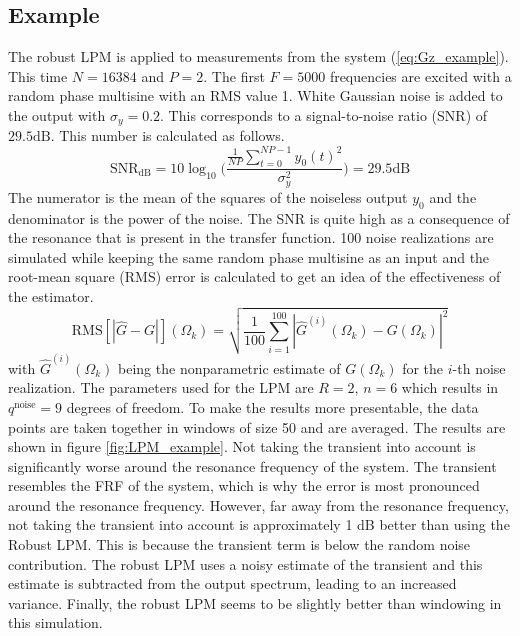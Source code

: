 \newpage
\subsection{Example}
The robust LPM is applied to measurements from the system (\ref{eq:Gz_example}). This time $N = 16384$ and $P=2$. The first $F=5000$ frequencies are excited with a random phase multisine with an RMS value 1. White Gaussian noise is added to the output with $\sigma_y = 0.2$. This corresponds to a signal-to-noise ratio (SNR) of $29.5 \mathrm{dB}$. This number is calculated as follows.
\begin{equation*}
    \mathrm{SNR}_{\mathrm{dB}} = 10 \log_{10} \Big ( \frac{\frac{1}{NP}\sum_{t=0}^{NP-1}y_0(t)^2}{\sigma_y^2} \Big ) = 29.5 \mathrm{dB}
\end{equation*}
The numerator is the mean of the squares of the noiseless output $y_0$ and the denominator is the power of the noise. The SNR is quite high as a consequence of the resonance that is present in the transfer function. 100 noise realizations are simulated while keeping the same random phase multisine as an input and the root-mean square (RMS) error is calculated to get an idea of the effectiveness of the estimator.
\begin{equation*}
    \text{RMS}[|\hat G - G|](\Omega_k) = \sqrt{\frac{1}{100}\sum_{i=1}^{100}|\hat G^{(i)}(\Omega_k)-G(\Omega_k)|^2} 
\end{equation*}
with $\hat G^{(i)}(\Omega_k)$ being the nonparametric estimate of $G(\Omega_k)$ for the $i$-th noise realization. The parameters used for the LPM are $R=2$, $n = 6$ which results in $q^{\text{noise}} = 9$ degrees of freedom. To make the results more presentable, the data points are taken together in windows of size 50 and are averaged. The results are shown in figure \ref{fig:LPM_example}. Not taking the transient into account is significantly worse around the resonance frequency of the system. The transient resembles the FRF of the system, which is why the error is most pronounced around the resonance frequency. However, far away from the resonance frequency, not taking the transient into account is approximately 1 dB better than using the Robust LPM. This is because the transient term is below the random noise contribution. The robust LPM uses a noisy estimate of the transient and this estimate is subtracted from the output spectrum, leading to an increased variance. Finally, the robust LPM seems to be slightly better than windowing in this simulation.


